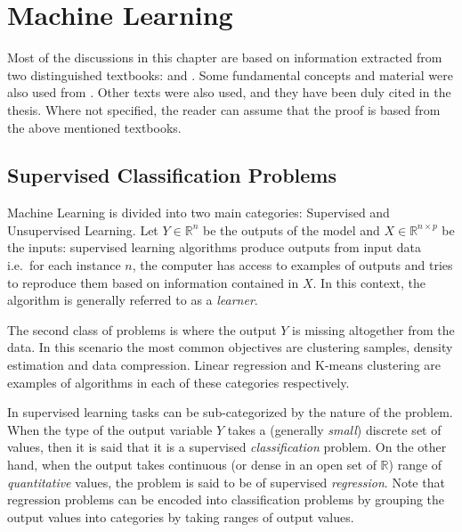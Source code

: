 
\chapter{Machine Learning}
\label{ch:machineLearning}

Most of the discussions in this chapter are based on information extracted from two distinguished textbooks: \textcite{bishop-patternRecognition} and \textcite{hastie-elemstatslearn}. Some fundamental concepts and material were also used from \cite{scikit-learn}. Other texts were also used, and they have been duly cited in the thesis. Where not specified, the reader can assume that the proof is based from the above mentioned textbooks.


\section{Supervised Classification Problems}
\label{section-supervised-learning}


Machine Learning is divided into two main categories: Supervised and Unsupervised Learning. Let $Y \in \mathbb{R}^n$ be the outputs of the model and $X \in \mathbb{R}^{n \times p}$ be the inputs: supervised learning algorithms produce outputs from input data i.e.\ for each instance $n$, the computer has access to examples of outputs and tries to reproduce them based on information contained in $X$. In this context, the algorithm is generally referred to as a \textit{learner}.

The second class of problems is where the output $Y$ is missing altogether from the data. In this scenario the most common objectives are clustering samples, density estimation and data compression. Linear regression and K-means clustering are examples of algorithms in each of these categories respectively.


In supervised learning tasks can be sub-categorized by the nature of the problem. When the type of the output variable $Y$ takes a (generally \textit{small}) discrete set of values, then it is said that it is a supervised \textit{classification} problem. On the other hand, when the output takes continuous (or dense in an open set of $\mathbb{R}$) range of \textit{quantitative} values, the problem is said to be of supervised \textit{regression}. Note that regression problems can be encoded into classification problems by grouping the output values into categories by taking ranges of output values.

